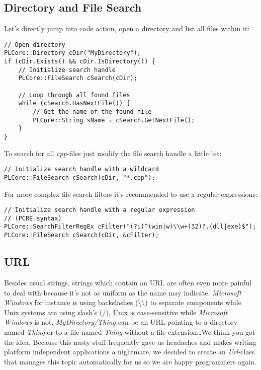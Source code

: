 \subsection{Directory and File Search}
Let's directly jump into code action, open a directory and list all files within it:

\begin{lstlisting}[caption=Directory and file search usage example]
// Open directory
PLCore::Directory cDir("MyDirectory");
if (cDir.Exists() && cDir.IsDirectory()) {
	// Initialize search handle
	PLCore::FileSearch cSearch(cDir);

	// Loop through all found files
	while (cSearch.HasNextFile()) {
		// Get the name of the found file
		PLCore::String sName = cSearch.GetNextFile();
	}
}
\end{lstlisting}

To search for all \emph{cpp}-files just modify the file search handle a little bit:

\begin{lstlisting}[caption=Wildcard search handle]
// Initialize search handle with a wildcard
PLCore::FileSearch cSearch(cDir, "*.cpp");
\end{lstlisting}

For more complex file search filters it's recommended to use a regular expressions:

\begin{lstlisting}[caption=Regular expression search handle]
// Initialize search handle with a regular expression
// (PCRE syntax)
PLCore::SearchFilterRegEx cFilter("(?i)^(win|w)\\w+(32)?.(dll|exe)$");
PLCore::FileSearch cSearch(cDir, &cFilter);
\end{lstlisting}




\subsection{\ac{URL}}
Besides usual strings, strings which contain an \ac{URL} are often even more painful to deal with because it's not as uniform as the name may indicate. \emph{Microsoft Windows} for instance is using backslashes (\textbackslash\textbackslash) to separate components while Unix systems are using slash's (/), Unix is case-sensitive while \emph{Microsoft Windows} is not, \emph{MyDirectory/Thing} can be an \ac{URL} pointing to a directory named \emph{Thing} or to a file named \emph{Thing} without a file extension\ldots We think you got the idea. Because this nasty stuff frequently gave us headaches and makes writing platform independent applications a nightmare, we decided to create an \emph{Url}-class that manages this topic automatically for us so we are happy programmers again.


